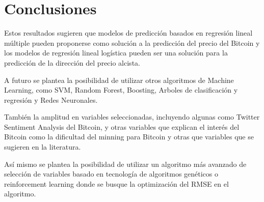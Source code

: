 \documentclass[a4paper,12pt,twocolumn]{article}
\begin{document}
\section{Conclusiones}

Estos resultados sugieren que modelos de predicción basados en regresión lineal múltiple  pueden proponerse como solución a la predicción del precio del Bitcoin y los modelos de regresión lineal logística pueden ser una solución para la predicción de la dirección del precio alcista.

A futuro se plantea la posibilidad de utilizar otros algoritmos de Machine Learning, como SVM, Random Forest, Boosting, Arboles de clasificación y regresión y Redes Neuronales.

También la amplitud en variables seleccionadas, incluyendo algunas como Twitter Sentiment Analysis del Bitcoin, y otras variables que explican el interés del Bitcoin como la dificultad del minning para Bitcoin y otras que variables que se sugieren en la literatura.

Así mismo se plantea la posibilidad de utilizar un algoritmo más avanzado de selección de variables basado en tecnología de algoritmos genéticos o reinforcement learning donde se busque la optimización del RMSE en el algoritmo. 
\end{document}
